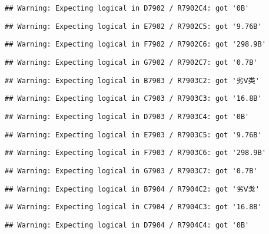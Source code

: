 \documentclass[
]{article}
\begin{document}
\begin{verbatim}
## Warning: Expecting logical in D7902 / R7902C4: got '0B'
\end{verbatim}

\begin{verbatim}
## Warning: Expecting logical in E7902 / R7902C5: got '9.76B'
\end{verbatim}

\begin{verbatim}
## Warning: Expecting logical in F7902 / R7902C6: got '298.9B'
\end{verbatim}

\begin{verbatim}
## Warning: Expecting logical in G7902 / R7902C7: got '0.7B'
\end{verbatim}

\begin{verbatim}
## Warning: Expecting logical in B7903 / R7903C2: got '劣Ⅴ类'
\end{verbatim}

\begin{verbatim}
## Warning: Expecting logical in C7903 / R7903C3: got '16.8B'
\end{verbatim}

\begin{verbatim}
## Warning: Expecting logical in D7903 / R7903C4: got '0B'
\end{verbatim}

\begin{verbatim}
## Warning: Expecting logical in E7903 / R7903C5: got '9.76B'
\end{verbatim}

\begin{verbatim}
## Warning: Expecting logical in F7903 / R7903C6: got '298.9B'
\end{verbatim}

\begin{verbatim}
## Warning: Expecting logical in G7903 / R7903C7: got '0.7B'
\end{verbatim}

\begin{verbatim}
## Warning: Expecting logical in B7904 / R7904C2: got '劣Ⅴ类'
\end{verbatim}

\begin{verbatim}
## Warning: Expecting logical in C7904 / R7904C3: got '16.8B'
\end{verbatim}

\begin{verbatim}
## Warning: Expecting logical in D7904 / R7904C4: got '0B'
\end{verbatim}
\end{document}
